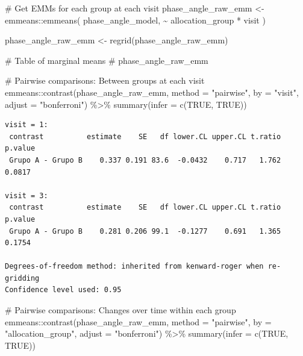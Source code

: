 \documentclass[
  12pt,
]{article}
\newenvironment{Shaded}{\begin{snugshade}}{\end{snugshade}}
\newcommand{\AttributeTok}[1]{\textcolor[rgb]{0.40,0.45,0.13}{#1}}
\newcommand{\CommentTok}[1]{\textcolor[rgb]{0.37,0.37,0.37}{#1}}
\newcommand{\ConstantTok}[1]{\textcolor[rgb]{0.56,0.35,0.01}{#1}}
\newcommand{\FunctionTok}[1]{\textcolor[rgb]{0.28,0.35,0.67}{#1}}
\newcommand{\NormalTok}[1]{\textcolor[rgb]{0.00,0.23,0.31}{#1}}
\newcommand{\OtherTok}[1]{\textcolor[rgb]{0.00,0.23,0.31}{#1}}
\newcommand{\SpecialCharTok}[1]{\textcolor[rgb]{0.37,0.37,0.37}{#1}}
\newcommand{\StringTok}[1]{\textcolor[rgb]{0.13,0.47,0.30}{#1}}
\begin{document}
\begin{Shaded}
\begin{Highlighting}[]
\CommentTok{\# Get EMMs for each group at each visit}
\NormalTok{phase\_angle\_raw\_emm }\OtherTok{\textless{}{-}}\NormalTok{ emmeans}\SpecialCharTok{::}\FunctionTok{emmeans}\NormalTok{(}
\NormalTok{    phase\_angle\_model, }
    \SpecialCharTok{\textasciitilde{}}\NormalTok{ allocation\_group }\SpecialCharTok{*}\NormalTok{ visit}
\NormalTok{)}

\NormalTok{phase\_angle\_raw\_emm }\OtherTok{\textless{}{-}} \FunctionTok{regrid}\NormalTok{(phase\_angle\_raw\_emm)}

\CommentTok{\# Table of marginal means}
\CommentTok{\# phase\_angle\_raw\_emm}

\CommentTok{\# Pairwise comparisons: Between groups at each visit}
\NormalTok{emmeans}\SpecialCharTok{::}\FunctionTok{contrast}\NormalTok{(phase\_angle\_raw\_emm,}
\AttributeTok{method =} \StringTok{"pairwise"}\NormalTok{, }\AttributeTok{by =} \StringTok{"visit"}\NormalTok{,}
\AttributeTok{adjust =} \StringTok{"bonferroni"}\NormalTok{) }\SpecialCharTok{\%\textgreater{}\%} \FunctionTok{summary}\NormalTok{(}\AttributeTok{infer =} \FunctionTok{c}\NormalTok{(}\ConstantTok{TRUE}\NormalTok{, }\ConstantTok{TRUE}\NormalTok{))}
\end{Highlighting}
\end{Shaded}

\begin{verbatim}
visit = 1:
 contrast          estimate    SE   df lower.CL upper.CL t.ratio p.value
 Grupo A - Grupo B    0.337 0.191 83.6  -0.0432    0.717   1.762  0.0817

visit = 3:
 contrast          estimate    SE   df lower.CL upper.CL t.ratio p.value
 Grupo A - Grupo B    0.281 0.206 99.1  -0.1277    0.691   1.365  0.1754

Degrees-of-freedom method: inherited from kenward-roger when re-gridding 
Confidence level used: 0.95 
\end{verbatim}

\begin{Shaded}
\begin{Highlighting}[]
\CommentTok{\# Pairwise comparisons: Changes over time within each group}
\NormalTok{emmeans}\SpecialCharTok{::}\FunctionTok{contrast}\NormalTok{(phase\_angle\_raw\_emm,}
\AttributeTok{method =} \StringTok{"pairwise"}\NormalTok{, }\AttributeTok{by =} \StringTok{"allocation\_group"}\NormalTok{,}
\AttributeTok{adjust =} \StringTok{"bonferroni"}\NormalTok{) }\SpecialCharTok{\%\textgreater{}\%} \FunctionTok{summary}\NormalTok{(}\AttributeTok{infer =} \FunctionTok{c}\NormalTok{(}\ConstantTok{TRUE}\NormalTok{, }\ConstantTok{TRUE}\NormalTok{))}
\end{Highlighting}
\end{Shaded}
\end{document}
